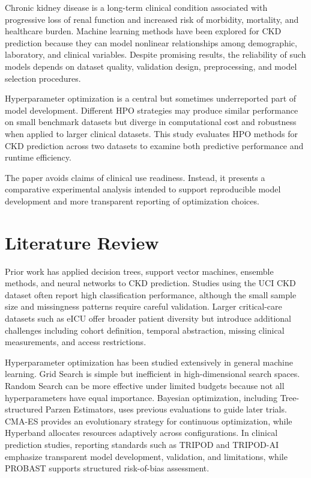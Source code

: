 \documentclass[runningheads]{llncs}
\begin{document}
Chronic kidney disease is a long-term clinical condition associated with progressive loss of renal function and increased risk of morbidity, mortality, and healthcare burden. Machine learning methods have been explored for CKD prediction because they can model nonlinear relationships among demographic, laboratory, and clinical variables. Despite promising results, the reliability of such models depends on dataset quality, validation design, preprocessing, and model selection procedures.

Hyperparameter optimization is a central but sometimes underreported part of model development. Different HPO strategies may produce similar performance on small benchmark datasets but diverge in computational cost and robustness when applied to larger clinical datasets. This study evaluates HPO methods for CKD prediction across two datasets to examine both predictive performance and runtime efficiency.

The paper avoids claims of clinical use readiness. Instead, it presents a comparative experimental analysis intended to support reproducible model development and more transparent reporting of optimization choices.

\section{Literature Review}

Prior work has applied decision trees, support vector machines, ensemble methods, and neural networks to CKD prediction. Studies using the UCI CKD dataset often report high classification performance, although the small sample size and missingness patterns require careful validation. Larger critical-care datasets such as eICU offer broader patient diversity but introduce additional challenges including cohort definition, temporal abstraction, missing clinical measurements, and access restrictions.

Hyperparameter optimization has been studied extensively in general machine learning. Grid Search is simple but inefficient in high-dimensional search spaces. Random Search can be more effective under limited budgets because not all hyperparameters have equal importance. Bayesian optimization, including Tree-structured Parzen Estimators, uses previous evaluations to guide later trials. CMA-ES provides an evolutionary strategy for continuous optimization, while Hyperband allocates resources adaptively across configurations. In clinical prediction studies, reporting standards such as TRIPOD and TRIPOD-AI emphasize transparent model development, validation, and limitations, while PROBAST supports structured risk-of-bias assessment.
\end{document}
